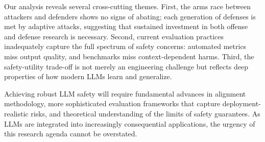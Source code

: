 \documentclass[conference]{IEEEtran}
\begin{document}
Our analysis reveals several cross-cutting themes. First, the arms race between attackers and defenders shows no signs of abating; each generation of defenses is met by adaptive attacks, suggesting that sustained investment in both offense and defense research is necessary. Second, current evaluation practices inadequately capture the full spectrum of safety concerns: automated metrics miss output quality, and benchmarks miss context-dependent harms. Third, the safety-utility trade-off is not merely an engineering challenge but reflects deep properties of how modern LLMs learn and generalize.

Achieving robust LLM safety will require fundamental advances in alignment methodology, more sophisticated evaluation frameworks that capture deployment-realistic risks, and theoretical understanding of the limits of safety guarantees. As LLMs are integrated into increasingly consequential applications, the urgency of this research agenda cannot be overstated.




\end{document}
